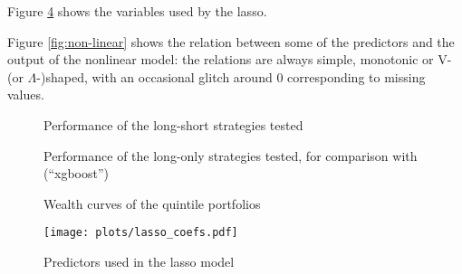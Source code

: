 \documentclass[12pt]{article}
\begin{document}
Figure \ref{fig:lasso-coef} shows the variables used by the lasso.

Figure \ref{fig:non-linear} shows the relation between some of the predictors and
the output of the nonlinear model: 
the relations are always simple, monotonic or V- (or $\Lambda$-)shaped,
with an occasional glitch around 0 corresponding to missing values. 

\begin{figure}[htbp]
\centering
\makebox[\textwidth][c]{%

}
\caption{Performance of the long-short strategies tested}
\label{fig:perf}
\end{figure}

\begin{figure}[htbp]
\centering
\makebox[\textwidth][c]{%

}
\caption{Performance of the long-only strategies tested, for comparison with \cite{coqueret_machine_2020} (``xgboost'')}
\label{fig:perf}
\end{figure}

\begin{figure}[htbp]
\centering
{}
\caption{Wealth curves of the quintile portfolios}
\label{fig:wealth-curves}
\end{figure}

\begin{figure}[htbp]
\centering
\texttt{[image: plots/lasso\_coefs.pdf]}%
\caption{Predictors used in the lasso model}
\label{fig:lasso-coef}
\end{figure}
\end{document}
